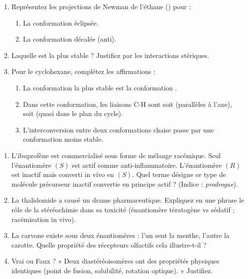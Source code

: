 \documentclass[11pt]{article}
\begin{document}
\begin{exercice}
\begin{enumerate}
    \item Représentez les projections de Newman de l'éthane () pour :
    \begin{enumerate}
        \item La conformation éclipsée.
        \item La conformation décalée (anti).
    \end{enumerate}
    \item Laquelle est la plus stable ? Justifiez par les interactions stériques.
    \item Pour le cyclohexane, complétez les affirmations :
    \begin{enumerate}
        \item La conformation la plus stable est la conformation \underline{\hspace{3cm}}.
        \item Dans cette conformation, les liaisons C-H sont soit \underline{\hspace{2cm}} (parallèles à l'axe), soit \underline{\hspace{2cm}} (quasi dans le plan du cycle).
        \item L'interconversion entre deux conformations chaise passe par une conformation \underline{\hspace{2cm}} moins stable.
    \end{enumerate}
\end{enumerate}
\end{exercice}

\begin{exercice}
\begin{enumerate}
    \item L'ibuprofène est commercialisé sous forme de mélange racémique. Seul l'énantiomère $(S)$ est actif comme anti-inflammatoire. L'énantiomère $(R)$ est inactif mais converti in vivo en $(S)$. Quel terme désigne ce type de molécule précurseur inactif convertie en principe actif ? (Indice : \textit{prodrogue}).
    \item La thalidomide a causé un drame pharmaceutique. Expliquez en une phrase le rôle de la stéréochimie dans sa toxicité (énantiomère tératogène vs sédatif ; racémisation in vivo).
    \item La carvone existe sous deux énantiomères : l'un sent la menthe, l'autre la carotte. Quelle propriété des récepteurs olfactifs cela illustre-t-il ?
    \item Vrai ou Faux ? « Deux diastéréoisomères ont des propriétés physiques identiques (point de fusion, solubilité, rotation optique). » Justifiez.
\end{enumerate}
\end{exercice}
\end{document}
